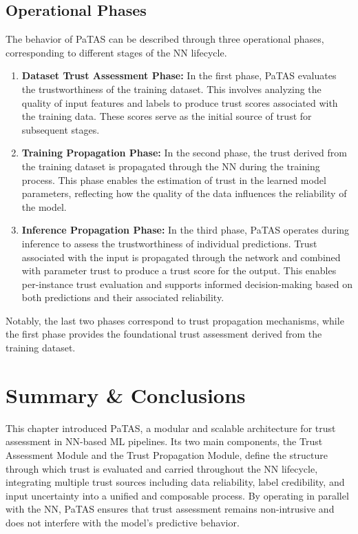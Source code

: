 \subsection{Operational Phases}
The behavior of \ac{PaTAS} can be described through three operational phases, corresponding to different stages of the \ac{NN} lifecycle.
\begin{enumerate}
    \item \textbf{Dataset Trust Assessment Phase:} In the first phase, \ac{PaTAS} evaluates the trustworthiness of the training dataset. This involves analyzing the quality of input features and labels to produce trust scores associated with the training data. These scores serve as the initial source of trust for subsequent stages.
    \item \textbf{Training Propagation Phase:} In the second phase, the trust derived from the training dataset is propagated through the \ac{NN} during the training process. This phase enables the estimation of trust in the learned model parameters, reflecting how the quality of the data influences the reliability of the model.
    \item \textbf{Inference Propagation Phase:} In the third phase, \ac{PaTAS} operates during inference to assess the trustworthiness of individual predictions. Trust associated with the input is propagated through the network and combined with parameter trust to produce a trust score for the output. This enables per-instance trust evaluation and supports informed decision-making based on both predictions and their associated reliability.
\end{enumerate}
Notably, the last two phases correspond to trust propagation mechanisms, while the first phase provides the foundational trust assessment derived from the training dataset.

\section{Summary \& Conclusions}

This chapter introduced \ac{PaTAS}, a modular and scalable architecture for trust assessment in \ac{NN}-based \ac{ML} pipelines. Its two main components, the Trust Assessment Module and the Trust Propagation Module, define the structure through which trust is evaluated and carried throughout the \ac{NN} lifecycle, integrating multiple trust sources including data reliability, label credibility, and input uncertainty into a unified and composable process. By operating in parallel with the \ac{NN}, \ac{PaTAS} ensures that trust assessment remains non-intrusive and does not interfere with the model's predictive behavior.

